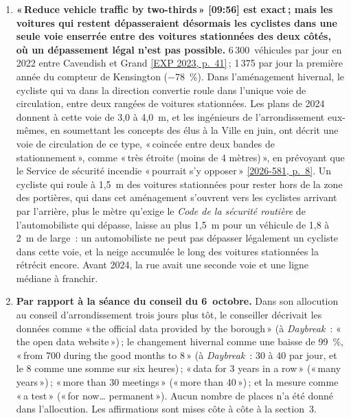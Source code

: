 \documentclass[10pt,letterpaper]{article}
\newcommand{\repourl}{https://github.com/OpenMobilityData/Terrebonne-open-sources}
\newcommand{\pagesurl}{https://openmobilitydata.github.io/Terrebonne-access-requests}
\newcommand{\cliptime}[1]{\textsf{\small[#1]}}
\newcommand{\pgl}[2]{\href{\pagesurl/2026-581/raw/01_emails_mandate_counts.pdf\#page=#1}{\textsf{\small[2026-581, p.~#2]}}}
\newcommand{\pg}[1]{\pgl{#1}{#1}}
\newcommand{\exppg}[1]{\href{\repourl/blob/main/2023-exp-mobility-study/raw/EXP_Etude_de_mobilite_rue_de_Terrebonne_2023.pdf}{\textsf{\small[EXP 2023, p.~#1]}}}
\begin{document}
\begin{enumerate}[nosep,itemsep=0.3em,leftmargin=1.4em]
  \item \begin{minipage}[t]{\linewidth}\textbf{«\,Reduce vehicle traffic by two-thirds\,» \cliptime{09:56} est exact\,; mais les voitures qui restent dépasseraient désormais les cyclistes dans une seule voie enserrée entre des voitures stationnées des deux côtés, où un dépassement légal n'est pas possible.} 6\,300~véhicules par jour en 2022 entre Cavendish et Grand \exppg{41}\,; 1\,375 par jour la première année du compteur de Kensington ($-78$~\%). Dans l'aménagement hivernal, le cycliste qui va dans la direction convertie roule dans l'unique voie de circulation, entre deux rangées de voitures stationnées. Les plans de 2024 donnent à cette voie de 3{,}0 à 4{,}0~m, et les ingénieurs de l'arrondissement eux-mêmes, en soumettant les concepts des élus à la Ville en juin, ont décrit une voie de circulation de ce type, «\,coincée entre deux bandes de stationnement\,», comme «\,très étroite (moins de 4 mètres)\,», en prévoyant que le Service de sécurité incendie «\,pourrait s'y opposer\,» \pg{8}. Un cycliste qui roule à 1{,}5~m des voitures stationnées pour rester hors de la zone des portières, qui dans cet aménagement s'ouvrent vers les cyclistes arrivant par l'arrière, plus le mètre qu'exige le \emph{Code de la sécurité routière} de l'automobiliste qui dépasse, laisse au plus 1{,}5~m pour un véhicule de 1{,}8 à 2~m de large~: un automobiliste ne peut pas dépasser légalement un cycliste dans cette voie, et la neige accumulée le long des voitures stationnées la rétrécit encore. Avant 2024, la rue avait une seconde voie et une ligne médiane à franchir.\end{minipage}\vspace{0.35em}
  \item \begin{minipage}[t]{\linewidth}\textbf{Par rapport à la séance du conseil du 6~octobre.} Dans son allocution au conseil d'arrondissement trois jours plus tôt, le conseiller décrivait les données comme «\,the official data provided by the borough\,» (à \emph{Daybreak}~: «\,the open data website\,»)\,; le changement hivernal comme une baisse de 99~\%, «\,from 700 during the good months to 8\,» (à \emph{Daybreak}~: 30 à 40 par jour, et le 8 comme une somme sur six heures)\,; «\,data for 3 years in a row\,» («\,many years\,»)\,; «\,more than 30 meetings\,» («\,more than 40\,»)\,; et la mesure comme «\,a test\,» («\,for now… permanent\,»). Aucun nombre de places n'a été donné dans l'allocution. Les affirmations sont mises côte à côte à la section~3.\end{minipage}\vspace{0.35em}
\end{enumerate}
\end{document}

